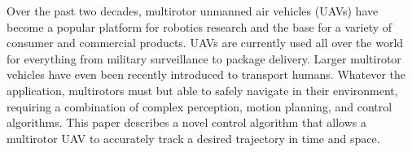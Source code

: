 

Over the past two decades, multirotor unmanned air vehicles (UAVs) have become a
popular platform for robotics research and the base for a variety of consumer and
commercial products. UAVs are currently used all over the world for everything
from military surveillance to package delivery. Larger multirotor vehicles
have even been recently introduced to transport humans. Whatever the
application, multirotors must but able to safely navigate in their environment,
requiring a combination of complex perception, motion planning, and control
algorithms. This paper describes a novel control algorithm that allows a multirotor UAV to
accurately track a desired trajectory in time and space. 
